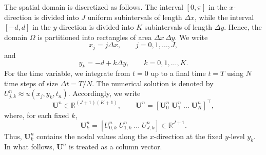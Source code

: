 \documentclass[12pt]{article}
\numberwithin{equation}{section}
\begin{document}
The spatial domain is discretized as follows. The interval $[0,\pi]$ in the
$x$-direction is divided into $J$ uniform subintervals of length $\Delta x$,
while the interval $[-d,d]$ in the $y$-direction is divided into $K$
subintervals of length $\Delta y$. Hence, the domain $\Omega$ is partitioned
into rectangles of area $\Delta x\,\Delta y$. We write
\[
x_j=j\Delta x,\qquad j=0,1,\dots,J,
\]
and
\[
y_k=-d+k\Delta y,\qquad k=0,1,\dots,K.
\]
For the time variable, we integrate from $t=0$ up to a final time
$t=T$ using $N$ time steps of size $\Delta t=T/N$. The numerical
solution is denoted by $U_{j,k}^n\approx u(x_j,y_k,t_n)$. Accordingly, we write
\[
\boldsymbol{U}^n \in \mathbb{R}^{(J+1)(K+1)},\qquad
\boldsymbol{U}^n=
[\boldsymbol{U}_0^n\; \boldsymbol{U}_1^n\; \dots\; \boldsymbol{U}_{K}^n]^\top,
\]
where, for each fixed $k$,
\begin{equation}\label{vecU}
\boldsymbol{U}_k^n=
[U_{0,k}^n\; U_{1,k}^n\; \dots\; U_{J,k}^n]
\in\mathbb{R}^{J+1}.
\end{equation}
Thus, $\boldsymbol{U}_k^n$ contains the nodal values along the $x$-direction
at the fixed $y$-level $y_k$. In what follows, $\boldsymbol{U}^n$ is treated
as a column vector.
\end{document}
